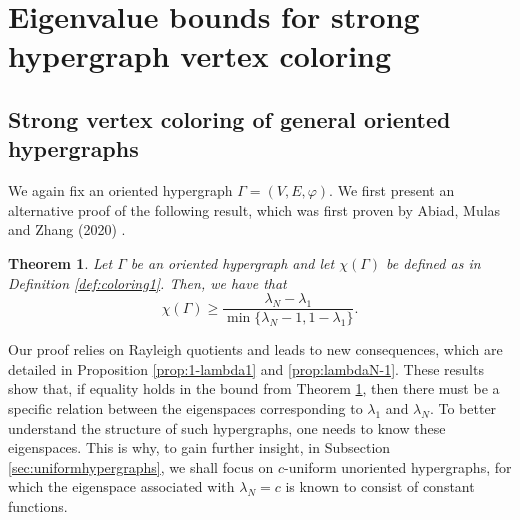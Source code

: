 \documentclass{article}
\theoremstyle{plain}
\newtheorem{theorem}{Theorem}[section]
\theoremstyle{definition}
\theoremstyle{remark}
\begin{document}

\section{Eigenvalue bounds for strong hypergraph vertex coloring}\label{sec:strong}
\subsection{Strong vertex coloring of general oriented hypergraphs}
We again fix an oriented hypergraph $\Gamma = (V, E, \varphi)$.
We first present an alternative proof of the following result, which was first proven by Abiad, Mulas and Zhang (2020) \cite[Corollary 5.4]{Abiad20}. 
\begin{theorem}\label{thm:cor5.4AMZ}
    Let $\Gamma$ be an oriented hypergraph and let $\chi(\Gamma)$ be defined as in Definition \ref{def:coloring1}. Then, we have that
    \[
    \chi(\Gamma) \geq \frac{\lambda_N - \lambda_1}{\min\bigl\{ \lambda_N-1, 1-\lambda_1 \bigr\}}.
    \]
\end{theorem}
Our proof relies on Rayleigh quotients and leads to new consequences, which are detailed in Proposition \ref{prop:1-lambda1} and \ref{prop:lambdaN-1}. These results show that, if equality holds in the bound from Theorem \ref{thm:cor5.4AMZ}, then there must be a specific relation between the eigenspaces corresponding to $\lambda_1$ and $\lambda_N$. To better understand the structure of such hypergraphs, one needs to know these eigenspaces. This is why, to gain further insight, in Subsection \ref{sec:uniformhypergraphs}, we shall focus on $c$-uniform unoriented hypergraphs, for which the eigenspace associated with $\lambda_N=c$ is known to consist of constant functions.\\
\end{document}
